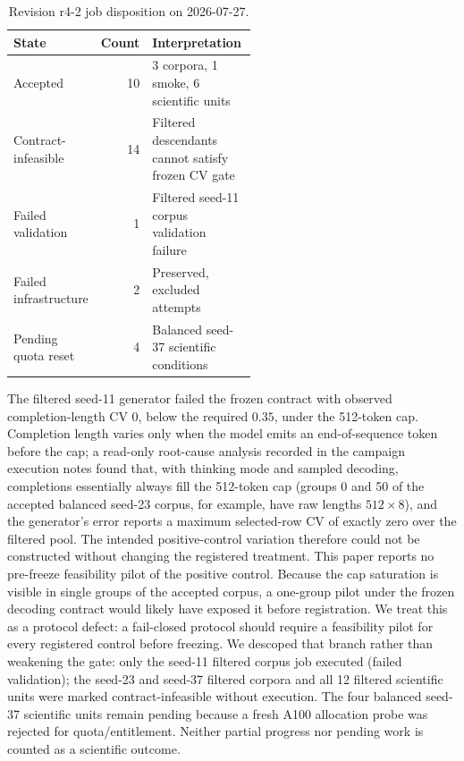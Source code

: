 \documentclass{article}
\begin{document}
\begin{table}[t]
  \centering
  \caption{Revision r4-2 job disposition on 2026-07-27.}
  \label{tab:state}
  \begin{tabular}{lrp{0.54\linewidth}}
    \toprule
    State & Count & Interpretation \\
    \midrule
    Accepted & 10 & 3 corpora, 1 smoke, 6 scientific units \\
    Contract-infeasible & 14 & Filtered descendants cannot satisfy frozen CV gate \\
    Failed validation & 1 & Filtered seed-11 corpus validation failure \\
    Failed infrastructure & 2 & Preserved, excluded attempts \\
    Pending quota reset & 4 & Balanced seed-37 scientific conditions \\
    \bottomrule
  \end{tabular}
\end{table}

The filtered seed-11 generator failed the frozen contract with observed
completion-length CV $0$, below the required $0.35$, under the 512-token cap.
Completion length varies only when the model emits an end-of-sequence token
before the cap; a read-only root-cause analysis recorded in the campaign
execution notes found that, with thinking mode and sampled decoding, completions
essentially always fill the 512-token cap (groups 0 and 50 of the accepted
balanced seed-23 corpus, for example, have raw lengths $512\times8$), and the
generator's error reports a maximum selected-row CV of exactly zero over the
filtered pool.  The intended positive-control variation
therefore could not be constructed without changing the registered treatment.
This paper reports no pre-freeze feasibility pilot of the positive control.  Because the cap saturation is
visible in single groups of the accepted corpus, a one-group pilot under the
frozen decoding contract would likely have exposed it before registration.
We treat this as a protocol defect: a fail-closed protocol should require a
feasibility pilot for every registered control before freezing.  We descoped that branch rather than weakening the gate: only the seed-11
filtered corpus job executed (failed validation); the seed-23 and seed-37
filtered corpora and all 12 filtered scientific units were marked
contract-infeasible without execution.  The four balanced seed-37 scientific units remain
pending because a fresh A100 allocation probe was rejected for
quota/entitlement.  Neither partial progress nor pending work is counted as a
scientific outcome.
\end{document}
